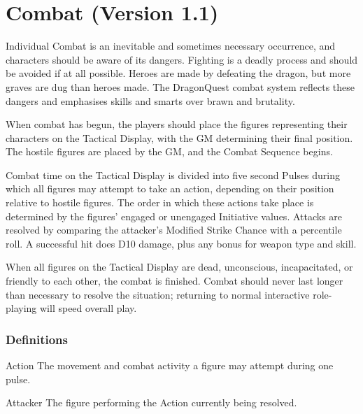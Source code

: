 \chapter{Combat (Version 1.1)}
\label{combat}

\begin{multicols*}{3}

Individual Combat is an inevitable and sometimes necessary occurrence,
and characters should be aware of its dangers. Fighting is a deadly
process and should be avoided if at all possible. Heroes are made by
defeating the dragon, but more graves are dug than heroes made. The
DragonQuest combat system reflects these dangers and emphasises skills
and smarts over brawn and brutality.

When combat has begun, the players should place the figures
representing their characters on the Tactical Display, with the GM
determining their final position. The hostile figures are placed by
the GM, and the Combat Sequence begins.

Combat time on the Tactical Display is divided into five second Pulses
during which all figures may attempt to take an action, depending on
their position relative to hostile figures. The order in which these
actions take place is determined by the figures' engaged or unengaged
Initiative values. Attacks are resolved by comparing the attacker's
Modified Strike Chance with a percentile roll. A successful hit does
D10 damage, plus any bonus for weapon type and skill.

When all figures on the Tactical Display are dead, unconscious,
incapacitated, or friendly to each other, the combat is
finished. Combat should never last longer than necessary to resolve
the situation; returning to normal interactive role-playing will speed
overall play.

\subsection{Definitions}

\begin{Description}
\item[Action] The movement and combat activity a figure may attempt during
one pulse.

\item[Attacker] The figure performing the Action currently being resolved.


\end{Description}
\end{multicols*}
